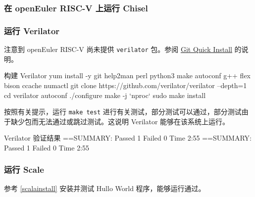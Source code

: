 \documentclass[xcolor=table,dvipsnames,svgnames,aspectratio=169]{ctexbeamer}
\begin{document}


\subsubsection{在 openEuler RISC-V 上运行 Chisel}


\begin{frame}
  \frametitle{运行 Verilator}
  注意到 openEuler RISC-V 尚未提供 \lstinline|verilator| 包。参阅 \href{https://veripool.org/guide/latest/install.html#git-quick-install}{Git Quick Install} 的说明。

  \begin{codeblock}[language=bash]{构建 Verilator}
yum install -y git help2man perl python3 make autoconf g++ flex bison ccache numactl
git clone https://github.com/verilator/verilator --depth=1
cd verilator
autoconf
./configure
make -j `nproc`
sudo make install
  \end{codeblock}

  \newpage

  按照有关提示，运行 \lstinline|make test| 进行有关测试，部分测试可以通过，部分测试由于缺少包而无法通过或跳过测试。这说明 Verilator 能够在该系统上运行。

  \begin{codeblock}[language=bash]{Verilator 验证结果}
==SUMMARY: Passed 1  Failed 0  Time 2:55
==SUMMARY: Passed 1  Failed 0  Time 2:55
  \end{codeblock}
\end{frame}

\begin{frame}
  \frametitle{运行 Scale}
  参考 \ref{scalainstall} 安装并测试 Hullo World 程序，能够运行通过。
\end{frame}
\end{document}
